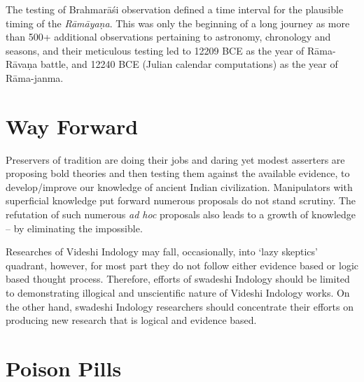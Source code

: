The testing of Brahmarāśi observation defined a time interval for the plausible timing of the \textit{Rāmāyaṇa}. This was only the beginning of a long journey as more than 500+ additional observations pertaining to astronomy, chronology and seasons, and their meticulous testing led to 12209 BCE as the year of Rāma-Rāvaṇa battle, and 12240 BCE (Julian calendar computations) as the year of Rāma-janma.


\section*{Way Forward}

Preservers of tradition are doing their jobs and daring yet modest asserters are proposing bold theories and then testing them against the available evidence, to develop/improve our knowledge of ancient Indian civilization. Manipulators with superficial knowledge put forward numerous proposals do not stand scrutiny. The refutation of such numerous \textit{ad hoc} proposals also leads to a growth of knowledge – by eliminating the impossible.

Researches of Videshi Indology may fall, occasionally, into ‘lazy skeptics’ quadrant, however, for most part they do not follow either evidence based or logic based thought process. Therefore, efforts of swadeshi Indology should be limited to demonstrating illogical and unscientific nature of Videshi Indology works. On the other hand, swadeshi Indology researchers should concentrate their efforts on producing new research that is logical and evidence based.


\section*{Poison Pills}

